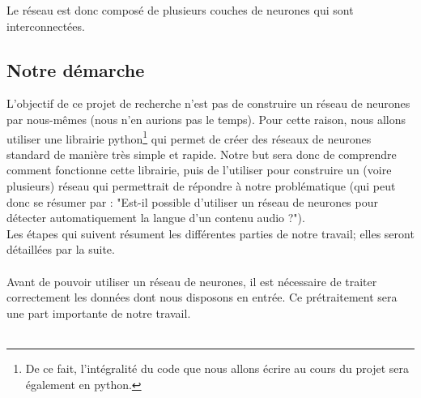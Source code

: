 \documentclass{article}
\begin{document}
\noindent Le réseau est donc composé de plusieurs couches de neurones qui sont interconnectées.\\  

\subsection{Notre démarche}

L'objectif de ce projet de recherche n'est pas de construire un réseau de neurones par nous-mêmes (nous n'en aurions pas le temps). Pour cette raison, nous allons utiliser une librairie python\footnote{De ce fait, l'intégralité du code que nous allons écrire au cours du projet sera également en python.} qui permet de créer des réseaux de neurones standard de manière très simple et rapide. Notre but sera donc de comprendre comment fonctionne cette librairie, puis de l'utiliser pour construire un (voire plusieurs) réseau qui permettrait de répondre à notre problématique (qui peut donc se résumer par : "Est-il possible d'utiliser un réseau de neurones pour détecter automatiquement la langue d'un contenu audio ?").\\
Les étapes qui suivent résument les différentes parties de notre travail; elles seront détaillées par la suite.\\
 \\
Avant de pouvoir utiliser un réseau de neurones, il est nécessaire de traiter correctement les données dont nous disposons en entrée. Ce prétraitement sera une part importante de notre travail.\\
 \\
\end{document}
